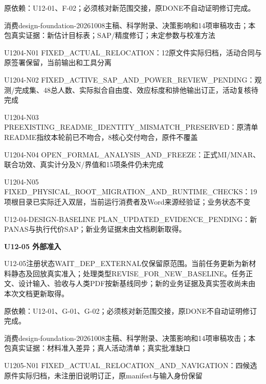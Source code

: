 \documentclass[11pt,a4paper]{article}
\newcommand{\reviewsection}[1]{\par\Needspace{5\baselineskip}\vspace{10pt}\begin{center}{\titlelatin\titlecjk\bfseries\fontsize{14}{20}\selectfont #1}\end{center}}
\begin{document}
原依赖：U12-\allowbreak{}01、F-\allowbreak{}02；必须核对新范围交接，原DONE不自动证明修订完成。


消费design-\allowbreak{}foundation-\allowbreak{}20261008主稿、科学附录、决策影响和14项审稿攻击；本包真实证据：新估计目标表；SAP/\allowbreak{}精度修订；未定参数与校准方法


U1204-\allowbreak{}N01 FIXED\_\allowbreak{}ACTUAL\_\allowbreak{}RELOCATION：12原文件实际归档，活动合同与原签署保留，当前输出和工具分离


U1204-\allowbreak{}N02 FIXED\_\allowbreak{}ACTIVE\_\allowbreak{}SAP\_\allowbreak{}AND\_\allowbreak{}POWER\_\allowbreak{}REVIEW\_\allowbreak{}PENDING：观测/\allowbreak{}完成集、48总人数、实际拟合自由度、效应标度和排他输出订正，活动复核待完成


U1204-\allowbreak{}N03 PREEXISTING\_\allowbreak{}README\_\allowbreak{}IDENTITY\_\allowbreak{}MISMATCH\_\allowbreak{}PRESERVED：原清单README指纹本轮前已不吻合，8核心交付吻合，原件不覆盖


U1204-\allowbreak{}N04 OPEN\_\allowbreak{}FORMAL\_\allowbreak{}ANALYSIS\_\allowbreak{}AND\_\allowbreak{}FREEZE：正式MI/\allowbreak{}MNAR、联合功效、真实计分及N/\allowbreak{}界值和15项条件仍未完成


U1204-\allowbreak{}N05 FIXED\_\allowbreak{}PHYSICAL\_\allowbreak{}ROOT\_\allowbreak{}MIGRATION\_\allowbreak{}AND\_\allowbreak{}RUNTIME\_\allowbreak{}CHECKS：19项根目录已实际迁入双层，当前运行消费者及Word来源经验证；业务状态不变


U12-\allowbreak{}04-\allowbreak{}DESIGN-\allowbreak{}BASELINE PLAN\_\allowbreak{}UPDATED\_\allowbreak{}EVIDENCE\_\allowbreak{}PENDING：新PANAS与执行代价SAP；新业务证据未由文档刷新取得。


\reviewsection{U12-\allowbreak{}05 外部准入}
U12-\allowbreak{}05注册状态WAIT\_\allowbreak{}DEP\_\allowbreak{}EXTERNAL仅保留原范围。当前任务更新为新材料静态及回放真实准入；处理类型REVISE\_\allowbreak{}FOR\_\allowbreak{}NEW\_\allowbreak{}BASELINE。任务正文、设计输入、验收与人类PDF按新基线同步；新的业务证据及真实签收尚未由本次文档更新取得。


原依赖：U12-\allowbreak{}01、G-\allowbreak{}01、G-\allowbreak{}02；必须核对新范围交接，原DONE不自动证明修订完成。


消费design-\allowbreak{}foundation-\allowbreak{}20261008主稿、科学附录、决策影响和14项审稿攻击；本包真实证据：材料准入差异；真人活动清单；真实批准缺口


U1205-\allowbreak{}N01 FIXED\_\allowbreak{}ACTUAL\_\allowbreak{}RELOCATION\_\allowbreak{}AND\_\allowbreak{}NAVIGATION：四候选原件实际归档，未注册旧说明订正，原manifest与输入身份保留
\end{document}
